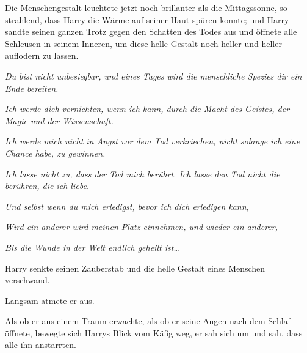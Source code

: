 Die Menschengestalt leuchtete jetzt noch brillanter als die Mittagssonne, so strahlend, dass Harry die Wärme auf seiner Haut spüren konnte; und Harry sandte seinen ganzen Trotz gegen den Schatten des Todes aus und öffnete alle Schleusen in seinem Inneren, um diese helle Gestalt noch heller und heller auflodern zu lassen.

\emph{Du bist nicht unbesiegbar, und eines Tages wird die menschliche Spezies dir ein Ende bereiten.}

\emph{Ich werde dich vernichten, wenn ich kann, durch die Macht des Geistes, der Magie und der Wissenschaft.}

\emph{Ich werde mich nicht in Angst vor dem Tod verkriechen, nicht solange ich eine Chance habe, zu gewinnen.}

\emph{Ich lasse nicht zu, dass der Tod mich berührt. Ich lasse den Tod nicht die berühren, die ich liebe.}

\emph{Und selbst wenn du mich erledigst, bevor ich dich erledigen kann,}

\emph{Wird ein anderer wird meinen Platz einnehmen, und wieder ein anderer,}

\emph{Bis die Wunde in der Welt endlich geheilt ist…}

Harry senkte seinen Zauberstab und die helle Gestalt eines Menschen verschwand.

Langsam atmete er aus.

Als ob er aus einem Traum erwachte, als ob er seine Augen nach dem Schlaf öffnete, bewegte sich Harrys Blick vom Käfig weg, er sah sich um und sah, dass alle ihn anstarrten.

